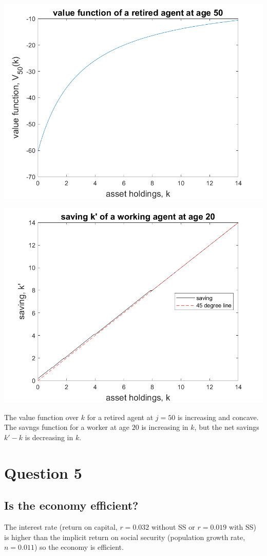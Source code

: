\documentclass[11pt]{article} %
\begin{document}
\includegraphics{fig1}

\includegraphics{fig2}

The value function over $k$ for a retired agent at $j=50$ is increasing and concave.  The savngs function for a worker at age $20$ is increasing in $k$, but the net savings $k'-k$ is decreasing in $k$.

\section{Question 5}

\subsection{Is the economy efficient?}
The interest rate (return on capital, $r=0.032$ without SS or $r=0.019$ with SS) is higher than the implicit return on social security (population growth rate, $n = 0.011$) so the economy is efficient.
\end{document}
